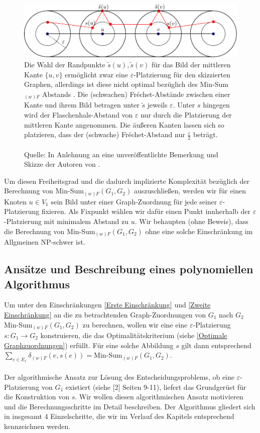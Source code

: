 \documentclass[a4paper, 12pt, twoside]{article}
\theoremstyle{Format1} %
\begin{document}
\begin{figure}[H]
    \centering
    \includegraphics[width=\textwidth]{chapter_3_example_0.pdf}
	\caption{Die Wahl der Randpunkte $\tilde{s}(u), \tilde{s}(v)$ für das Bild der mittleren Kante $\{u,v\}$ ermöglicht zwar eine $\varepsilon$-Platzierung
	für den skizzierten Graphen, allerdings ist diese nicht optimal bezüglich des Min-Sum$_{(w)F}$ Abstands .
	Die (schwachen) Fréchet-Abstände zwischen einer Kante und ihrem Bild betragen unter $\tilde{s}$ jeweils $\varepsilon$.
	Unter $s$ hingegen wird der Flaschenhals-Abstand von $\varepsilon$ nur durch die Platzierung der mittleren Kante angenommen.
	Die äußeren Kanten lassen sich so platzieren, dass der (schwache) Fréchet-Abstand nur $\frac{\varepsilon}{2}$ beträgt.
	\\
	\\
	Quelle: In Anlehnung an eine unveröffentlichte Bemerkung und Skizze der Autoren von \cite{Buchin}.
	}
    \label{chapter_3_example_0}
\end{figure}

Um diesen Freiheitsgrad und die dadurch implizierte Komplexität bezüglich der Berechnung von Min-Sum$_{(w)F}(G_1,G_2)$ auszuschließen,
werden wir für einen Knoten $u \in V_1$ sein Bild unter einer Graph-Zuordnung für jede seiner $\varepsilon$-Platzierung fixieren.
Als Fixpunkt wählen wir dafür einen Punkt innherhalb der $\varepsilon$-Platzierung mit minimalem Abstand zu $u$.
Wir behaupten (ohne Beweis), dass die Berechnung von Min-Sum$_{(w)F}(G_1,G_2)$ ohne eine solche Einschränkung im Allgmeinen NP-schwer ist.

\subsection{Ansätze und Beschreibung eines polynomiellen Algorithmus} \label{Grundidee des Algorithmus}
Um unter den Einschränkungen \ref{Erste Einschränkung} und \ref{Zweite Einschränkung} an die zu betrachtenden Graph-Zuordnungen von $G_1$ nach $G_2$
Min-Sum$_{(w)F}(G_1,G_2)$ zu berechnen, wollen wir eine
eine $\varepsilon$-Platzierung $s: G_1 \to G_2$ konstruieren, die das Optimalitätskriterium (siehe \ref{Optimale Graphzuordnungen}) erfüllt.
Für eine solche Abbildung $s$ gilt dann entsprechend $\sum_{e \in E_1}\delta_{(w)F}(e, s(e)) = \text{Min-Sum}_{(w)F}(G_1,G_2)$.
\\
\\
Der algorithmische Ansatz zur Lösung des Entscheidungsproblems, ob eine $\varepsilon$-Platzierung von $G_1$ existiert (siehe [2] Seiten 9-11), liefert das
Grundgerüst für die Konstruktion von $s$. Wir wollen diesen algorithmischen Ansatz motivieren und die Berechnungsschritte im Detail beschreiben.
Der Algorithmus gliedert sich in insgesamt 4 Einzelschritte, die wir im Verlauf des Kapitels entsprechend kennzeichnen werden.
\end{document}
